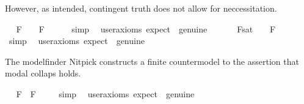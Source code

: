 \begin{isabellebody}
%
\begin{isamarkuptext}%
However, as intended, contingent truth does not allow for neccessitation.%
\end{isamarkuptext}\isamarkuptrue%
\ \isamarkupfalse%
\ {\isachardoublequoteopen}{\isacharbrackleft}{\isasymA}{\isasymphi}\isactrlsup F{\isacharbrackright}\ {\isacharequal}\ {\isasymtop}\ {\isasymlongrightarrow}\ {\isacharbrackleft}\isactrlbold {\isasymbox}{\isasymphi}\isactrlsup F{\isacharbrackright}\ {\isacharequal}\ {\isasymtop}\ {\isachardoublequoteclose}%
\isadelimproof
\ %
\endisadelimproof
%
\isatagproof
{}\isamarkupfalse%
\ simp\ \isamarkupfalse%
\ {\isacharbrackleft}user{\isacharunderscore}axioms{\isacharcomma}\ expect\ {\isacharequal}\ genuine{\isacharbrackright}\ \isamarkupfalse%
\ \ %
%
\endisatagproof
{\isafoldproof}%
%
\isadelimproof
%
\endisadelimproof
\isanewline
\ \isamarkupfalse%
\ {\isachardoublequoteopen}{\isacharbrackleft}{\isasymphi}\isactrlsup F{\isacharbrackright}\isactrlsup s\isactrlsup a\isactrlsup t\ {\isacharequal}\ {\isasymtop}\ {\isasymlongrightarrow}\ {\isacharbrackleft}\isactrlbold {\isasymbox}{\isasymphi}\isactrlsup F{\isacharbrackright}\ {\isacharequal}\ {\isasymtop}\ {\isachardoublequoteclose}%
\isadelimproof
\ %
\endisadelimproof
%
\isatagproof
{}\isamarkupfalse%
\ simp\ \isamarkupfalse%
\ {\isacharbrackleft}user{\isacharunderscore}axioms{\isacharcomma}\ expect\ {\isacharequal}\ genuine{\isacharbrackright}\ \isamarkupfalse%
\ \ %
%
\endisatagproof
{\isafoldproof}%
%
\isadelimproof
%
\endisadelimproof
%
\isamarkuptrue%
%
\begin{isamarkuptext}%
The modelfinder Nitpick constructs a finite countermodel to the assertion
  that modal collaps holds.%
\end{isamarkuptext}\isamarkuptrue%
\ \isamarkupfalse%
\ {\isachardoublequoteopen}{\isacharbrackleft}{\isasymphi}\isactrlsup F\ \isactrlbold {\isasymrightarrow}\ \isactrlbold {\isasymbox}{\isasymphi}\isactrlsup F{\isacharbrackright}\ {\isacharequal}\ {\isasymtop}{\isachardoublequoteclose}%
\isadelimproof
\ %
\endisadelimproof
%
\isatagproof
{}\isamarkupfalse%
\ simp\ \isamarkupfalse%
\ {\isacharbrackleft}user{\isacharunderscore}axioms{\isacharcomma}\ expect\ {\isacharequal}\ genuine{\isacharbrackright}\ \isamarkupfalse%

\end{isabellebody}
